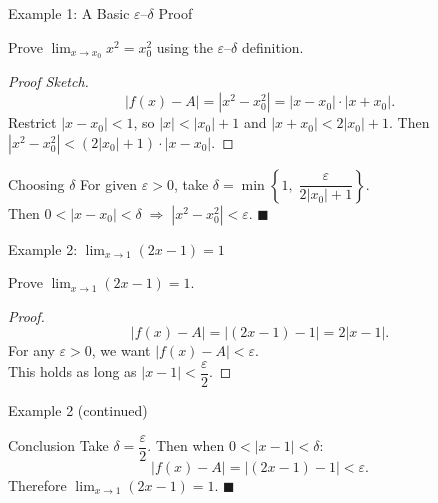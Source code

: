 \documentclass[aspectratio=169,10pt]{beamer}
\begin{document}
\begin{frame}{Example 1: A Basic $\varepsilon$--$\delta$ Proof}
  \begin{example}
    Prove $\displaystyle\lim_{x\to x_0}x^2 = x_0^2$ using the $\varepsilon$--$\delta$ definition.
  \end{example}
  \pause
  \begin{proof}[Proof Sketch]
    \[
      |f(x)-A| = |x^2 - x_0^2| = |x-x_0|\cdot|x+x_0|.
    \]
    \pause
    Restrict $|x-x_0|<1$, so $|x|<|x_0|+1$ and $|x+x_0|<2|x_0|+1$.
    \pause
    Then $|x^2-x_0^2| < (2|x_0|+1)\cdot|x-x_0|$.
  \end{proof}
  \pause
  \begin{block}{Choosing $\delta$}
    For given $\varepsilon>0$, take $\delta = \min\left\{1,\; \dfrac{\varepsilon}{2|x_0|+1}\right\}$.\\[4pt]
    Then $0<|x-x_0|<\delta \;\Longrightarrow\; |x^2-x_0^2|<\varepsilon$. \hfill$\blacksquare$
  \end{block}
\end{frame}

\begin{frame}{Example 2: $\displaystyle\lim_{x\to 1}(2x-1)=1$}
  \begin{example}
    Prove $\displaystyle\lim_{x\to 1}(2x-1)=1$.
  \end{example}
  \pause
  \begin{proof}[Proof]
    \[
      |f(x)-A| = |(2x-1)-1| = 2|x-1|.
    \]
    For any $\varepsilon>0$, we want $|f(x)-A|<\varepsilon$.\\[4pt]
    This holds as long as $|x-1| < \dfrac{\varepsilon}{2}$.
  \end{proof}
\end{frame}

\begin{frame}{Example 2 (continued)}
  \begin{block}{Conclusion}
    Take $\delta = \dfrac{\varepsilon}{2}$.
    Then when $0<|x-1|<\delta$:
    \[
      |f(x)-A| = |(2x-1)-1| < \varepsilon.
    \]
    Therefore $\displaystyle\lim_{x\to 1}(2x-1)=1$. \hfill$\blacksquare$
  \end{block}
\end{frame}
\end{document}
